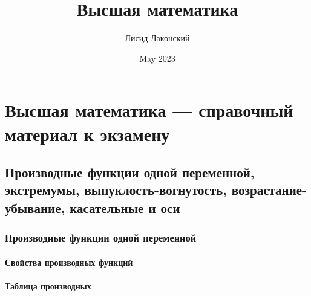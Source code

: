 \documentclass{article}
\title{Высшая математика}
\author{Лисид Лаконский}
\date{May 2023}
\begin{document}
\raggedright

\maketitle

\tableofcontents
\pagebreak

\section{Высшая математика — справочный материал к экзамену}

\subsection{Производные функции одной переменной, экстремумы, выпуклость-вогнутость, возрастание-убывание, касательные и оси}

\subsubsection{Производные функции одной переменной}

\paragraph{Свойства производных функций}

\begin{multienumerate}
\end{multienumerate}

\paragraph{Таблица производных}
\end{document}
